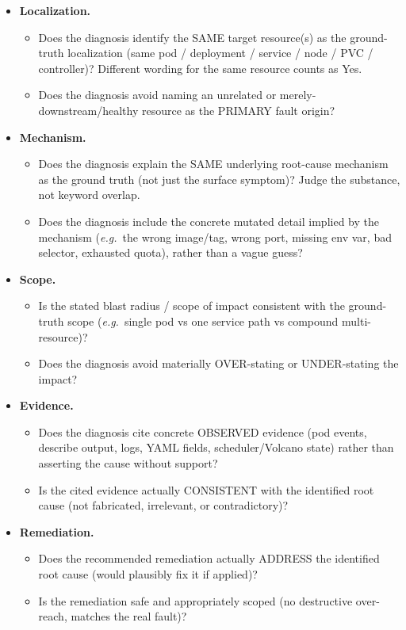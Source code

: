 \documentclass[letterpaper]{article}
\newcommand{\eg}{\textit{e.g.}}
\begin{document}
\begin{itemize}\itemsep1pt
\item[]\textbf{Localization.}
  \begin{itemize}\itemsep0pt
  \item[\textit{L1}] Does the diagnosis identify the SAME target resource(s) as the ground-truth localization (same pod / deployment / service / node / PVC / controller)? Different wording for the same resource counts as Yes.
  \item[\textit{L2}] Does the diagnosis avoid naming an unrelated or merely-downstream/healthy resource as the PRIMARY fault origin?
  \end{itemize}
\item[]\textbf{Mechanism.}
  \begin{itemize}\itemsep0pt
  \item[\textit{M1}] Does the diagnosis explain the SAME underlying root-cause mechanism as the ground truth (not just the surface symptom)? Judge the substance, not keyword overlap.
  \item[\textit{M2}] Does the diagnosis include the concrete mutated detail implied by the mechanism (\eg\ the wrong image/tag, wrong port, missing env var, bad selector, exhausted quota), rather than a vague guess?
  \end{itemize}
\item[]\textbf{Scope.}
  \begin{itemize}\itemsep0pt
  \item[\textit{S1}] Is the stated blast radius / scope of impact consistent with the ground-truth scope (\eg\ single pod vs one service path vs compound multi-resource)?
  \item[\textit{S2}] Does the diagnosis avoid materially OVER-stating or UNDER-stating the impact?
  \end{itemize}
\item[]\textbf{Evidence.}
  \begin{itemize}\itemsep0pt
  \item[\textit{E1}] Does the diagnosis cite concrete OBSERVED evidence (pod events, describe output, logs, YAML fields, scheduler/Volcano state) rather than asserting the cause without support?
  \item[\textit{E2}] Is the cited evidence actually CONSISTENT with the identified root cause (not fabricated, irrelevant, or contradictory)?
  \end{itemize}
\item[]\textbf{Remediation.}
  \begin{itemize}\itemsep0pt
  \item[\textit{R1}] Does the recommended remediation actually ADDRESS the identified root cause (would plausibly fix it if applied)?
  \item[\textit{R2}] Is the remediation safe and appropriately scoped (no destructive over-reach, matches the real fault)?
  \end{itemize}
\end{itemize}
\end{document}

